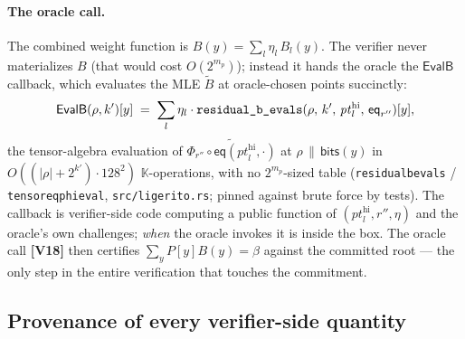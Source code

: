\documentclass[11pt]{article}
\newcommand{\K}{\mathbb{K}}            %
\newcommand{\mle}[1]{\widetilde{#1}}
\newcommand{\eq}{\mathsf{eq}}
\newcommand{\code}[1]{{\def\_{\textunderscore\allowbreak}\texttt{#1}}}
\newcommand{\Vc}[1]{\textbf{[V#1]}}    %
\begin{document}
\paragraph{The oracle call.}  The combined weight function is
$B(y) = \sum_l \eta_l\, B_l(y)$.  The verifier never materializes $B$
(that would cost $O(2^{m_p})$); instead it hands the oracle the
$\mathsf{EvalB}$ callback, which evaluates the MLE $\mle{B}$ at
oracle-chosen points succinctly:
\[
  \mathsf{EvalB}(\rho, k')[y] \;=\; \sum_l \eta_l \cdot
  \code{residual\_b\_evals}(\rho,\, k',\, \mathit{pt}_l^{\mathrm{hi}},\,
  \eq_{r''})[y],
\]
the tensor-algebra evaluation of
$\mle{\Phi_{r''} \circ \eq(\mathit{pt}_l^{\mathrm{hi}},\cdot)}$ at
$\rho \,\|\, \mathsf{bits}(y)$ in $O((|\rho| + 2^{k'})\cdot 128^2)$
$\K$-operations, with no $2^{m_p}$-sized table
(\code{residual\_b\_evals} / \code{tensor\_eq\_phi\_eval},
\code{src/ligerito.rs}; pinned against brute force by tests).  The
callback is verifier-side code computing a public function of
$(\mathit{pt}_l^{\mathrm{hi}}, r'', \eta)$ and the oracle's own
challenges; \emph{when} the oracle invokes it is inside the box.  The
oracle call \Vc{18} then certifies $\sum_y P[y] B(y) = \beta$ against the
committed root — the only step in the entire verification that touches
the commitment.

\subsection{Provenance of every verifier-side quantity}
\end{document}
